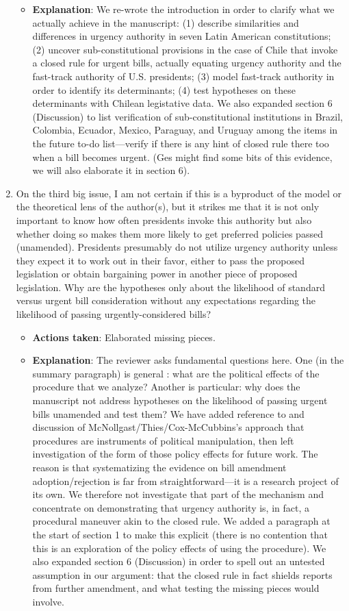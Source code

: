 \documentclass[article,letterpaper,times,12pt,listings-bw,microtype]{article}
\begin{document}
\begin{enumerate}
\begin{itemize}
\item \textbf{Explanation}: We re-wrote the introduction in order to clarify what we actually achieve in the manuscript: (1) describe similarities and differences in urgency authority in seven Latin American constitutions; (2) uncover sub-constitutional provisions in the case of Chile that invoke a closed rule for urgent bills, actually equating urgency authority and the fast-track authority of U.S. presidents; (3) model fast-track authority in order to identify its determinants; (4) test hypotheses on these determinants with Chilean legistative data. We also expanded section 6 (Discussion) to list verification of sub-constitutional institutions in Brazil, Colombia, Ecuador, Mexico, Paraguay, and Uruguay among the items in the future to-do list---verify if there is any hint of closed rule there too when a bill becomes urgent. (Ges might find some bits of this evidence, we will also elaborate it in section 6).
\end{itemize}
\item On the third big issue, I am not certain if this is a byproduct of the model or the theoretical lens of the author(s), but it strikes me that it is not only important to know how often presidents invoke this authority but also whether doing so makes them more likely to get preferred policies passed (unamended). Presidents presumably do not utilize urgency authority unless they expect it to work out in their favor, either to pass the proposed legislation or obtain bargaining power in another piece of proposed legislation. Why are the hypotheses only about the likelihood of standard versus urgent bill consideration without any expectations regarding the likelihood of passing urgently-considered bills?
\label{sec:orgc172133}
\begin{itemize}
\item \textbf{Actions taken}: Elaborated missing pieces.
\item \textbf{Explanation}: The reviewer asks fundamental questions here. One (in the summary paragraph) is general : what are the political effects of the procedure that we analyze? Another is particular: why does the manuscript not address hypotheses on the likelihood of passing urgent bills unamended and test them? We have added reference to and discussion of McNollgast/Thies/Cox-McCubbins's approach that procedures are instruments of political manipulation, then left investigation of the form of those policy effects for future work. The reason is that systematizing the evidence on bill amendment adoption/rejection is far from straightforward---it is a research project of its own. We therefore not investigate that part of the mechanism and concentrate on demonstrating that urgency authority is, in fact, a procedural maneuver akin to the closed rule. We added a paragraph at the start of section 1 to make this explicit (there is no contention that this is an exploration of the policy effects of using the procedure). We also expanded section 6 (Discussion) in order to spell out an untested assumption in our argument: that the closed rule in fact shields reports from further amendment, and what testing the missing pieces would involve.

\end{itemize}
\end{enumerate}
\end{document}
